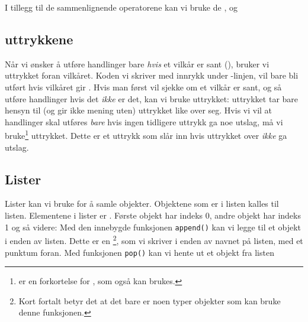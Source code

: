 I tillegg til de sammenlignende operatorene kan vi bruke de  ,  og 
\subsection*{ uttrykkene}
Når vi ønsker å utføre handlinger bare \textsl{hvis} et vilkår er sant (), bruker vi  uttrykket foran vilkåret. Koden vi skriver med innrykk under -linjen, vil bare bli utført hvis vilkåret gir . 
Hvis man først vil sjekke om et vilkår er sant, og så utføre handlinger hvis det \textsl{ikke} er det, kan vi bruke  uttrykket:
 uttrykket tar bare hensyn til (og gir ikke mening uten)  uttrykket like over seg. Hvis vi vil at handlinger skal utføres \textsl{bare} hvis ingen tidligere  uttrykk ga noe utslag, må vi bruke\footnote{ er en forkortelse for , som også kan brukes.}  uttrykket. Dette er et  uttrykk som slår inn hvis  uttrykket over \textsl{ikke} ga utslag.

\subsection*{Lister}
Lister kan vi bruke for å samle objekter. Objektene som er i listen kalles  til listen.
Elementene i lister er . Første objekt har indeks 0, andre objekt har indeks 1 og så videre:
Med den innebygde funksjonen \texttt{append()} kan vi legge til et objekt i enden av listen. Dette er en \footnote{Kort fortalt betyr det at det bare er noen typer objekter som kan bruke denne funksjonen.}, som vi skriver i enden av navnet på listen, med et punktum foran.
Med funksjonen \texttt{pop()} kan vi hente ut et objekt fra listen

